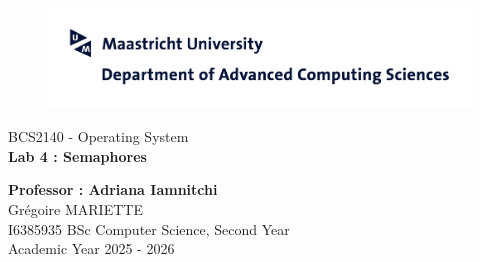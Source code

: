 \begin{titlepage}

\begin{figure}[h]
\centering
\includegraphics[scale=0.5]{TitlePage/img/bssc_dacs.jpg}
\end{figure}

\vspace{20mm}

\begin{center}

\begin{Large}
BCS2140 - Operating System\\
\vspace{2cm}
\textbf{Lab 4 : Semaphores} \\

\end{Large}


\vspace{90mm}
\textbf{Professor : Adriana Iamnitchi} \\


\vspace{20mm}
Grégoire MARIETTE\\
I6385935
BSc Computer Science, Second Year\\
\vspace{9mm}
Academic Year 2025 - 2026
\end{center}

\end{titlepage}